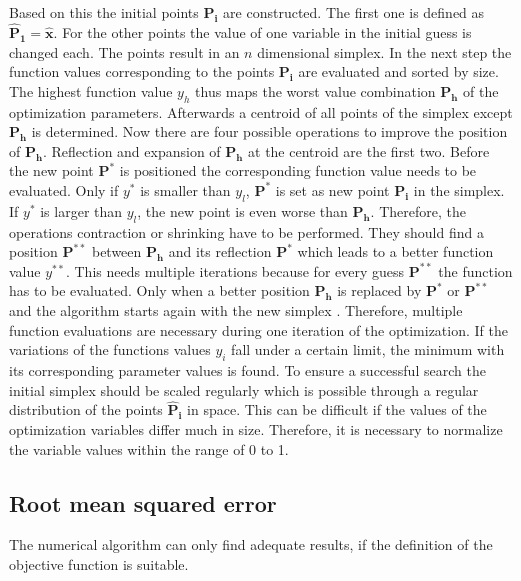 Based on this the initial points $\mathbf{\hat{P}_i}$ are constructed. The first one is defined as $\mathbf{\hat{P}_1} = \mathbf{\hat{x}}$. For the other points the value of one variable in the initial guess is changed each. The points result in an $n$ dimensional simplex. In the next step the function values corresponding to the points $\mathbf{P_i}$ are evaluated and sorted by size. The highest function value $y_h$ thus maps the worst value combination $\mathbf{P_h}$ of the optimization parameters. Afterwards a centroid of all points of the simplex except $\mathbf{P_h}$ is determined. Now there are four possible operations to improve the position of $\mathbf{P_h}$. Reflection and expansion of $\mathbf{P_h}$ at the centroid are the first two. Before the new point $\mathbf{P^{*}}$ is positioned the corresponding function value needs to be evaluated. Only if $y^{*}$ is smaller than $y_l$, $\mathbf{P^{*}}$ is set as new point $\mathbf{P_i}$ in the simplex. If $y^{*}$ is larger than $y_l$, the new point is even worse than $\mathbf{P_h}$. Therefore, the operations contraction or shrinking have to be performed. They should find a position $\mathbf{P^{**}}$ between $\mathbf{P_h}$ and its reflection $\mathbf{P^{*}}$ which leads to a better function value $y^{**}$. This needs multiple iterations because for every guess $\mathbf{P^{**}}$ the function has to be evaluated. Only when a better position $\mathbf{P_h}$ is replaced by $\mathbf{P^{*}}$ or $\mathbf{P^{**}}$ and the algorithm starts again with the new simplex \cite{nelder_simplex_1965}. Therefore, multiple function evaluations are necessary during one iteration of the optimization. If the variations of the functions values $y_i$ fall under a certain limit, the minimum with its corresponding parameter values is found. To ensure a successful search the initial simplex should be scaled regularly \cite{baudin_nelder-mead_nodate} which is possible through a regular distribution of the points $\mathbf{\hat{P}_i}$ in space. This can be difficult if the values of the optimization variables differ much in size. Therefore, it is necessary to normalize the variable values within the range of 0 to 1.

\subsection{Root mean squared error} \label{subsec: RMSE}
The numerical algorithm can only find adequate results, if the definition of the objective function is suitable. 





